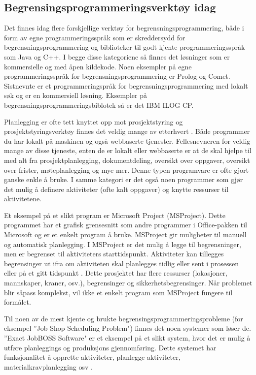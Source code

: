 \subsection{Begrensingsprogrammeringsverktøy idag}
Det finnes idag flere forskjellige verktøy for begrensningsprogrammering, både i form av egne programmeringsspråk som er skreddersydd for begrensningsprogrammering og biblioteker til godt kjente programmeringsspråk som Java og C++. I begge disse kategoriene så finnes det løsninger som er kommersielle og med åpen kildekode. Noen eksempler på egne programmeringsspråk for begrensningsprogrammering er Prolog og Comet. Sistnevnte er et programmeringspråk for begrensningsprogrammering med lokalt søk og er en kommersiell løsning. Eksempler på begrensningsprogrammeringsbiblotek så er det IBM ILOG CP.

Planlegging er ofte tett knyttet opp mot prosjektstyring og prosjektstyringsverktøy finnes det veldig mange av etterhvert \cite{projectmanagmenttoolswiki}. Både programmer du har lokalt på maskinen og også webbaserte tjenester. Fellesnevneren for veldig mange av disse tjeneste, enten de er lokalt eller webbaserte er at de skal hjelpe til med alt fra prosjektplanlegging, dokumentdeling, oversikt over oppgaver, oversikt over frister, møteplanlegging og mye mer. Denne typen programvare er ofte gjort ganske enkle å bruke. I samme kategori er det også noen programmer som gjør det mulig å definere aktiviteter (ofte kalt oppgaver) og knytte ressurser til aktivitetene.

Et eksempel på et slikt program er Microsoft Project (MSProject). Dette programmet har et grafisk grensesnitt som andre programmer i Office-pakken til Microsoft og er et enkelt program å bruke. MSProject gir muligheter til manuell og automatisk planlegging\cite{msproject2010blog}. I MSProject er det mulig å legge til begrensninger, men er begrenset til aktiviteters starttidspunkt. Aktiviteter kan tillegges begrensinger ut ifra om aktiviteten skal planlegges tidlig eller sent i prosessen eller på et gitt tidspunkt \cite{begrensingermsproject}. Dette prosjektet har flere ressurser (lokasjoner, mannskaper, kraner, osv.), begrensinger og sikkerhetsbegrensinger. Når problemet blir såpass komplekst, vil ikke et enkelt program som MSProject fungere til formålet.

Til noen av de mest kjente og brukte begrensingsprogrammeringsprobleme (for eksempel ''Job Shop Scheduling Problem") finnes det noen systemer som løser de. ''Exact JobBOSS Software" er et eksempel på et slikt system, hvor det er mulig å utføre planleggings og produksjons gjennomføring. Dette systemet har funksjonalitet å opprette aktiviteter, planlegge aktiviteter, materialkravplanlegging osv \cite{exact}.


